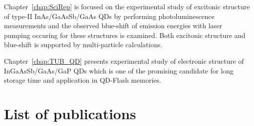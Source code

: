 \documentclass[
a4paper, %
11pt, %
onecolumn, %
openany, %
oldfontcommands,
]{memoir}
\begin{document}
Chapter~\ref{chap:SciRep} is focused on the experimental study of excitonic structure of type-II InAs/GaAsSb/GaAs QDs by performing photoluminescence measurements and the observed blue-shift of emission energies with laser pumping occuring for these structures is examined. Both excitonic structure and blue-shift is supported by multi-particle calculations.

Chapter~\ref{chap:TUB_QD} presents experimental study of electronic structure of InGaAsSb/GaAs/GaP QDs which is one of the promising candidate for long storage time and application in QD-Flash memories.   
\newpage 




\mainmatter

%






\appendix





%







\backmatter



%
%
%





%
\chapter{List of publications}\label{chap:publications}
\end{document}
